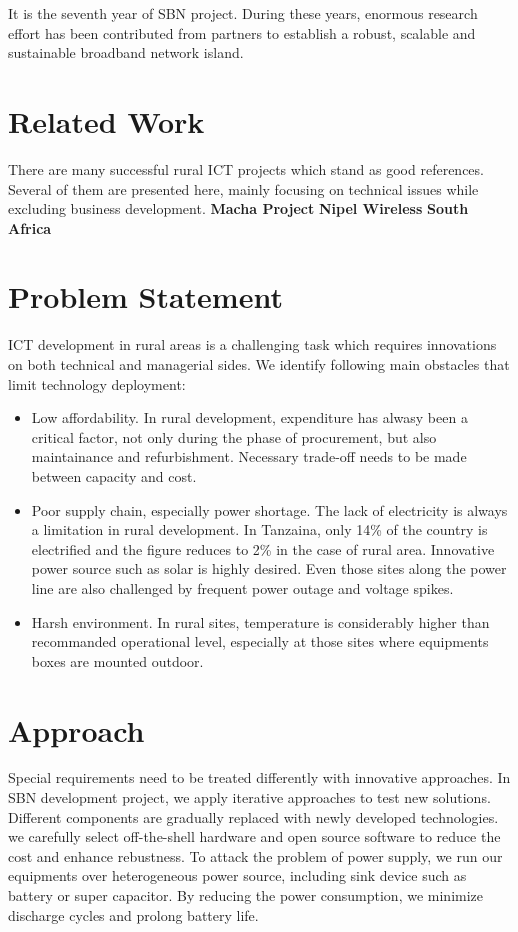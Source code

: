 It is the seventh year of SBN project. During these years, enormous research effort has been contributed from partners to establish a robust, scalable and sustainable broadband network island.

\section{Related Work}
There are many successful rural ICT projects which stand as good references. Several of them are presented here, mainly focusing on technical issues while excluding business development.
\textbf{Macha Project}
\textbf{Nipel Wireless}
\textbf{South Africa}

\section{Problem Statement}
ICT development in rural areas is a challenging task which requires innovations on both technical and managerial sides. We identify following main obstacles that limit technology deployment:
\begin{itemize}
\item Low affordability. In rural development, expenditure has alwasy been a critical factor, not only during the phase of procurement, but also maintainance and refurbishment. Necessary trade-off needs to be made between capacity and cost.
\item Poor supply chain, especially power shortage. The lack of electricity is always a limitation in rural development. In Tanzaina, only 14\% of the country is electrified and the figure reduces to 2\% in the case of rural area\cite{XXX}. Innovative power source such as solar is highly desired. Even those sites along the power line are also challenged by frequent power outage and voltage spikes.
\item Harsh environment. In rural sites, temperature is considerably higher than recommanded operational level, especially at those sites where equipments boxes are mounted outdoor.
\end{itemize}

\section{Approach}
Special requirements need to be treated differently with innovative approaches. In SBN development project, we apply iterative approaches to test new solutions. Different components are gradually replaced with newly developed technologies. we carefully select off-the-shell hardware and open source software to reduce the cost and enhance rebustness. To attack the problem of power supply, we run our equipments over heterogeneous power source, including sink device such as battery or super capacitor. By reducing the power consumption, we minimize discharge cycles and prolong battery life.

